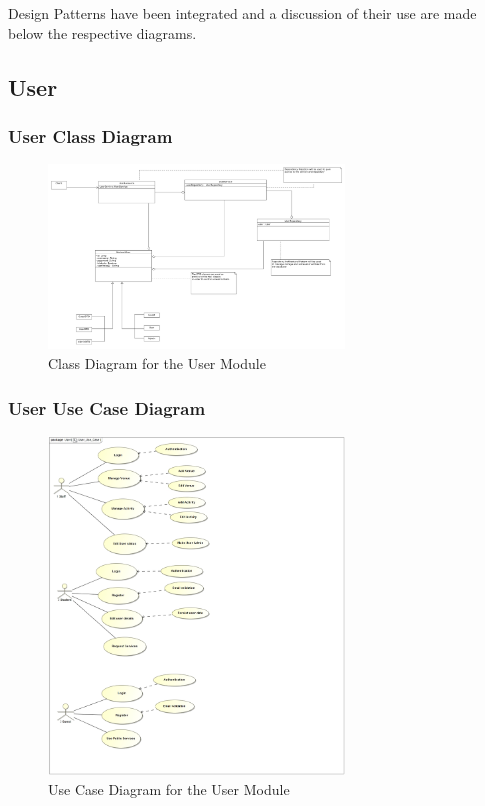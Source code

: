 \documentclass[runningheads,a4paper]{article}
\begin{document}
Design Patterns have been integrated and a discussion of their use are made below the respective diagrams.

\subsection{User} 
\subsubsection{User Class Diagram}
\begin{figure}[H]
   	\centering
   	\includegraphics[width=0.7\textwidth]{User_Class_Diagrams.png}
   	\caption{Class Diagram for the User Module}
\end{figure}

\subsubsection{User Use Case Diagram}
\begin{figure}[H]
   	\centering
   	\includegraphics[width=0.7\textwidth]{User_Use_Case.jpg}
   	\caption{Use Case Diagram for the User Module}
\end{figure}
\end{document}
